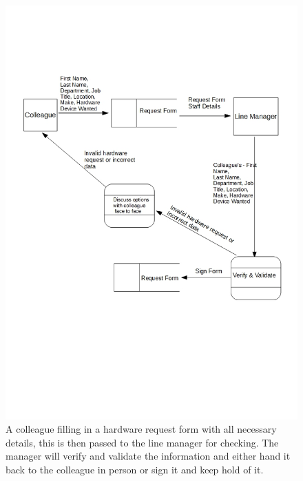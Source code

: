 \begin{figure}[H]
\includegraphics[width=\textwidth]{CurrentDFD.jpg}
\caption{A colleague filling in a hardware request form with all necessary details, this is then passed to the line manager for checking. The manager will verify and validate the information and either hand it back to the colleague in person or sign it and keep hold of it.} \label{Page1Interview}
\end{figure}

